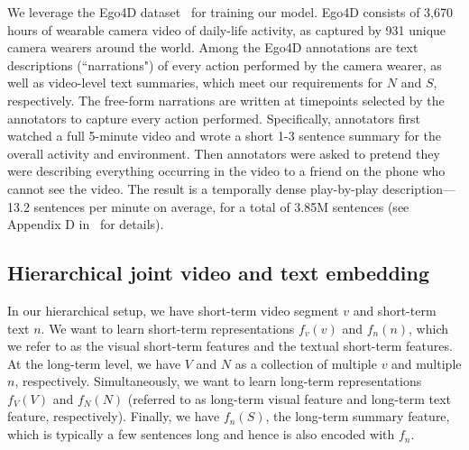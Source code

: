 \documentclass[10pt,twocolumn,letterpaper]{article}
\begin{document}
We leverage the Ego4D dataset~\cite{ego4d,ego4dcons} for training our model.  Ego4D consists of 3,670 hours of wearable camera video of daily-life activity, as captured by 931 unique camera wearers around the world.  Among the Ego4D annotations are text descriptions (``narrations") of every action performed by the camera wearer, as well as video-level text summaries, which meet our requirements for $N$ and $S$, respectively.  The free-form narrations are written at timepoints selected by the annotators to capture every action performed.  Specifically, annotators first watched a full 5-minute video and wrote a short 1-3 sentence summary for the overall activity and environment. 
Then annotators were asked to pretend they were describing everything occurring in the video to a friend on the phone who cannot see the video.  The result is a temporally dense play-by-play description---13.2 sentences per minute on average, for a total of 3.85M sentences (see Appendix D in~\cite{ego4d} for details).

\subsection{Hierarchical joint video and text embedding}
\label{sec:joint-video-text}


In our hierarchical setup, we have short-term video segment $v$ and short-term text $n$.
We want to learn short-term representations $f_v(v)$ and $f_n(n)$, which we refer to as the visual short-term features and the textual short-term features. At the long-term level, we have $V$ and $N$ as a collection of multiple $v$ and multiple $n$, respectively. Simultaneously, we want to learn long-term representations $f_V(V)$ and $f_N(N)$ (referred to as long-term visual feature and long-term text feature, respectively). Finally, we have $f_n(S)$, the long-term summary feature, which is typically a few sentences long and hence is also encoded with $f_n$. 
\end{document}
